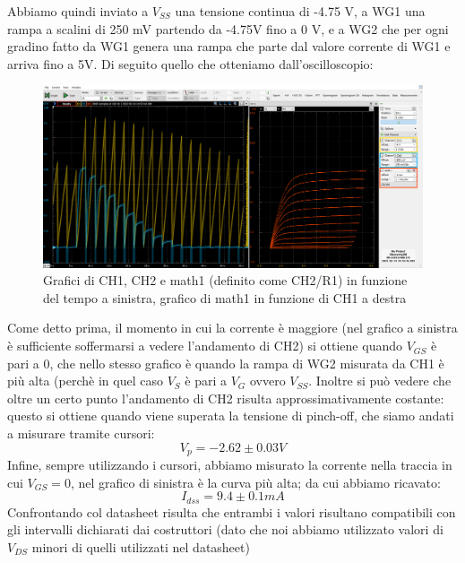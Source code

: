 \documentclass[10pt, a4paper, italian]{article}
\begin{document}
Abbiamo quindi inviato a $V_{SS}$ una tensione continua di -4.75 V, a WG1 una rampa a scalini di 250 mV partendo da -4.75V fino a 0 V, e a WG2 che per ogni gradino fatto da WG1 genera una rampa che parte dal valore corrente di WG1 e arriva fino a 5V.
Di seguito quello che otteniamo dall'oscilloscopio:
\begin{figure}[H]
    \centering
	\includegraphics[scale=0.4]{time}
    \caption{Grafici di CH1, CH2 e math1 (definito come CH2/R1) in funzione del tempo a sinistra, grafico di math1 in funzione di CH1 a destra}
\end{figure}
Come detto prima, il momento in cui la corrente è maggiore (nel grafico a sinistra è sufficiente soffermarsi a vedere l'andamento di CH2) si ottiene quando $V_{GS}$ è pari a 0, che nello stesso grafico è quando la rampa di WG2 misurata da CH1 è più alta (perchè in quel caso $V_S$ è pari a $V_G$ ovvero $V_{SS}$.
Inoltre si può vedere che oltre un certo punto l'andamento di CH2 risulta approssimativamente costante: questo si ottiene quando viene superata la tensione di pinch-off, che siamo andati a misurare tramite cursori:
\[
V_p=-2.62 \pm 0.03 V
\]
Infine, sempre utilizzando i cursori, abbiamo misurato la corrente nella traccia in cui $V_{GS}=0$, nel grafico di sinistra è la curva più alta; da cui abbiamo ricavato:
\[
I_{dss}=9.4 \pm 0.1 mA
\]
Confrontando col datasheet risulta che entrambi i valori risultano compatibili con gli intervalli dichiarati dai costruttori (dato che noi abbiamo utilizzato valori di $V_{DS}$ minori di quelli utilizzati nel datasheet)
\end{document}
